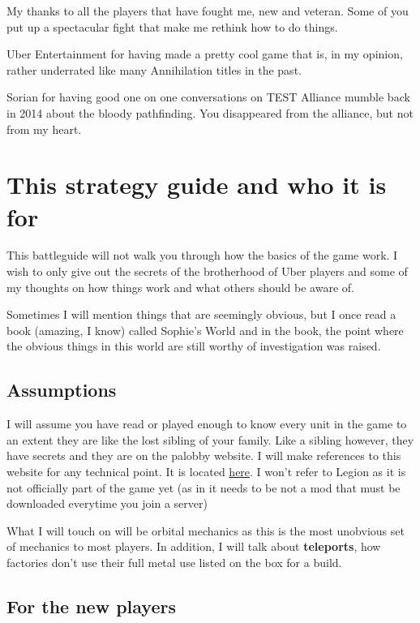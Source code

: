 \documentclass[]{article}
\begin{document}
My thanks to all the players that have fought me, new and veteran.  Some of you put up a spectacular fight that make me rethink how to do things.  

Uber Entertainment for having made a pretty cool game that is, in my opinion, rather underrated like many Annihilation titles in the past.  

Sorian for having good one on one conversations on TEST Alliance mumble back in 2014 about the bloody pathfinding.  You disappeared from the alliance, but not from my heart.

\section{This strategy guide and who it is for}

This battleguide will not walk you through how the basics of the game work.  I wish to only give out the secrets of the brotherhood of Uber players and some of my thoughts on how things work and what others should be aware of.  

Sometimes I will mention things that are seemingly obvious, but I once read a book (amazing, I know) called Sophie's World and in the book, the point where the obvious things in this world are still worthy of investigation was raised.  

\subsection{Assumptions}

I will assume you have read or played enough to know every unit in the game to an extent they are like the lost sibling of your family.  Like a sibling however, they have secrets and they are on the palobby website.  I will make references to this website for any technical point.  It is located \hyperref{https://palobby.com/units/?version=titans}{}{name}{here}.  I won't refer to Legion as it is not officially part of the game yet (as in it needs to be not a mod that must be downloaded everytime you join a server)

What I will touch on will be orbital mechanics as this is the most unobvious set of mechanics to most players.  In addition, I will talk about \textbf{teleports}, how factories don't use their full metal use listed on the box for a build.    

\subsection{For the new players}
\end{document}
